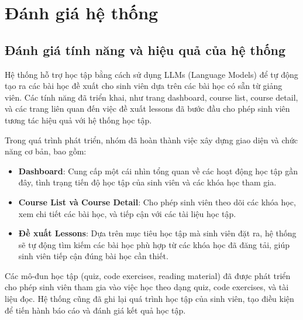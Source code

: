 \chapter{Đánh giá hệ thống}

\section{Đánh giá tính năng và hiệu quả của hệ thống}

Hệ thống hỗ trợ học tập bằng cách sử dụng LLMs (Language Models) để tự động tạo ra các bài học đề xuất cho sinh viên dựa trên các bài học có sẵn từ giảng viên. Các tính năng đã triển khai, như trang dashboard, course list, course detail, và các trang liên quan đến việc đề xuất lessons đã bước đầu cho phép sinh viên tương tác hiệu quả với hệ thống học tập.

Trong quá trình phát triển, nhóm đã hoàn thành việc xây dựng giao diện và chức năng cơ bản, bao gồm:

\begin{itemize}
    \item \textbf{Dashboard}: Cung cấp một cái nhìn tổng quan về các hoạt động học tập gần đây, tình trạng tiến độ học tập của sinh viên và các khóa học tham gia.
    \item \textbf{Course List và Course Detail}: Cho phép sinh viên theo dõi các khóa học, xem chi tiết các bài học, và tiếp cận với các tài liệu học tập.
    \item \textbf{Đề xuất Lessons}: Dựa trên mục tiêu học tập mà sinh viên đặt ra, hệ thống sẽ tự động tìm kiếm các bài học phù hợp từ các khóa học đã đăng tải, giúp sinh viên tiếp cận đúng bài học cần thiết.
\end{itemize}

Các mô-đun học tập (quiz, code exercises, reading material) đã được phát triển cho phép sinh viên tham gia vào việc học theo dạng quiz, code exercises, và tài liệu đọc. Hệ thống cũng đã ghi lại quá trình học tập của sinh viên, tạo điều kiện để tiến hành báo cáo và đánh giá kết quả học tập.
\newpage
